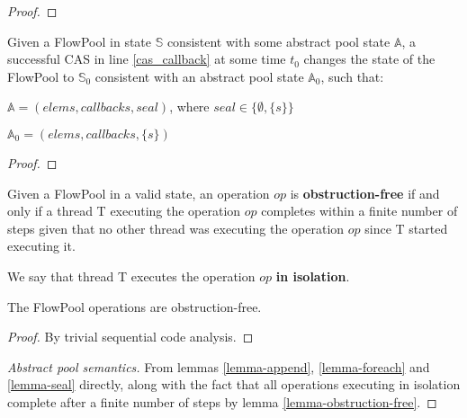 \documentclass[runningheads,a4paper]{llncs}
\begin{document}
\begin{proof}
\end{proof}


\begin{lemma}\label{lemma-seal}
Given a FlowPool in state $\mathbb{S}$ consistent with some abstract pool state $\mathbb{A}$, 
a successful CAS in line \ref{cas_callback} at some time $t_0$ changes the state of the FlowPool 
to $\mathbb{S}_0$ consistent with an abstract pool state $\mathbb{A}_0$, such that:

$\mathbb{A} = (elems, callbacks, seal)$, where $seal \in \{ \emptyset, \{ s \} \}$

$\mathbb{A}_0 = (elems, callbacks, \{ s \})$
\end{lemma}

\begin{proof}
\end{proof}


\begin{definition}
Given a FlowPool in a valid state, an operation $op$ is \textbf{obstruction-free} if and only if a thread T executing the operation $op$ completes within a finite number of steps given that no other thread was executing the operation $op$ since T started executing it.

We say that thread T executes the operation $op$ \textbf{in isolation}.
\end{definition}


\begin{lemma}\label{lemma-obstruction-free}
The FlowPool operations are obstruction-free.
\end{lemma}

\begin{proof}
By trivial sequential code analysis.
\end{proof}

\begin{proof}[Abstract pool semantics]
From lemmas \ref{lemma-append}, \ref{lemma-foreach} and \ref{lemma-seal} directly, along with the fact that all operations executing in isolation complete after a finite number of steps by lemma \ref{lemma-obstruction-free}.
\end{proof}


\end{document}
